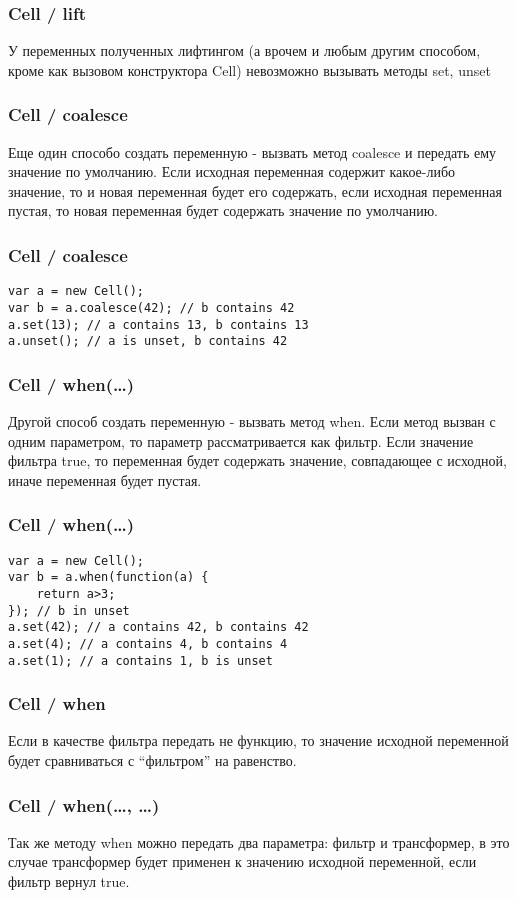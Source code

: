 \documentclass[xetex]{beamer}
\begin{document}
\begin{frame}[fragile]
\frametitle{Cell / lift}
У переменных полученных лифтингом (а врочем и любым другим способом, кроме как вызовом конструктора Cell) невозможно вызывать методы set, unset
\end{frame}


\begin{frame}[fragile]
\frametitle{Cell / coalesce}
Еще один способо создать переменную - вызвать метод coalesce и передать ему значение по умолчанию. Если исходная переменная содержит какое-либо значение, то и новая переменная будет его содержать, если исходная переменная пустая, то новая переменная будет содержать значение по умолчанию.
\end{frame}


\begin{frame}[fragile]
\frametitle{Cell / coalesce}
\begin{lstlisting}
var a = new Cell();
var b = a.coalesce(42); // b contains 42
a.set(13); // a contains 13, b contains 13
a.unset(); // a is unset, b contains 42
\end{lstlisting}
\end{frame}


\begin{frame}[fragile]
\frametitle{Cell / when(\dots)}
Другой способ создать переменную - вызвать метод when. Если метод вызван с одним параметром, то параметр рассматривается как фильтр. Если значение фильтра true, то переменная будет содержать значение, совпадающее с исходной, иначе переменная будет пустая.
\end{frame}


\begin{frame}[fragile]
\frametitle{Cell / when(\dots)}
\begin{lstlisting}
var a = new Cell();
var b = a.when(function(a) { 
    return a>3; 
}); // b in unset
a.set(42); // a contains 42, b contains 42
a.set(4); // a contains 4, b contains 4
a.set(1); // a contains 1, b is unset
\end{lstlisting}
\end{frame}


\begin{frame}[fragile]
\frametitle{Cell / when}
Если в качестве фильтра передать не функцию, то значение исходной переменной будет сравниваться с ``фильтром'' на равенство.
\end{frame}


\begin{frame}[fragile]
\frametitle{Cell / when(\dots, \dots)}
Так же методу when можно передать два параметра: фильтр и трансформер, в это случае трансформер будет применен к значению исходной переменной, если фильтр вернул true.
\end{frame}
\end{document}
